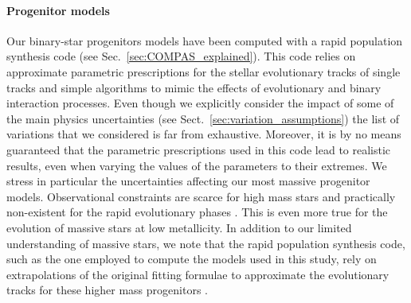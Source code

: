 \paragraph{Progenitor models} Our binary-star progenitors models have been computed with a rapid population synthesis code (see Sec.~\ref{sec:COMPAS_explained}). This code relies on approximate parametric prescriptions for the stellar evolutionary tracks of single tracks and simple algorithms to mimic the effects of evolutionary and binary interaction  processes. Even though we explicitly consider the impact of some of the main physics uncertainties (see Sect.~\ref{sec:variation_assumptions}) the list of variations that we considered is far from exhaustive. Moreover, it is by no means guaranteed that the parametric prescriptions used in this code lead to realistic results, even when varying the values of the parameters to their extremes. We stress in particular the uncertainties affecting our most massive progenitor models. Observational constraints are scarce for high mass stars and practically non-existent for the rapid evolutionary phases \citep[e.g.][]{Langer2012, Mapelli+2021}. This is even more true for the evolution of massive stars at low metallicity. In addition to our limited understanding of massive stars, we note that the rapid population synthesis code, such as the one employed to compute the models used in this study, rely on extrapolations of the original fitting formulae to approximate the evolutionary tracks for these higher mass progenitors \citep{Hurley+2000,Hurley+2002}. 
 
